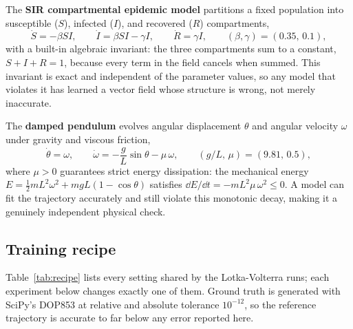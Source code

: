 The \textbf{SIR compartmental epidemic model} partitions a fixed population
into susceptible ($S$), infected ($I$), and recovered ($R$) compartments,
\begin{equation}
\dot S = -\beta S I, \qquad \dot I = \beta S I - \gamma I, \qquad \dot R = \gamma I,
\qquad (\beta,\gamma) = (0.35,\,0.1),
\label{eq:sir}
\end{equation}
with a built-in algebraic invariant: the three compartments sum to a
constant, $S+I+R=1$, because every term in the field cancels when summed.
This invariant is exact and independent of the parameter values, so any model
that violates it has learned a vector field whose structure is wrong, not
merely inaccurate.

The \textbf{damped pendulum} evolves angular displacement $\theta$ and
angular velocity $\omega$ under gravity and viscous friction,
\begin{equation}
\dot\theta = \omega, \qquad \dot\omega = -\frac{g}{L}\sin\theta - \mu\,\omega,
\qquad (g/L,\,\mu) = (9.81,\,0.5),
\label{eq:pendulum}
\end{equation}
where $\mu>0$ guarantees strict energy dissipation: the mechanical energy
$E=\tfrac{1}{2}mL^2\omega^2 + mgL(1-\cos\theta)$ satisfies
$\dd E/\dd t = -mL^2\mu\,\omega^2 \le 0$. A model can fit the trajectory
accurately and still violate this monotonic decay, making it a genuinely
independent physical check.

\subsection{Training recipe}

Table~\ref{tab:recipe} lists every setting shared by the Lotka-Volterra runs;
each experiment below changes exactly one of them. Ground truth is generated
with SciPy's DOP853 at relative and absolute tolerance $10^{-12}$, so the
reference trajectory is accurate to far below any error reported here.

